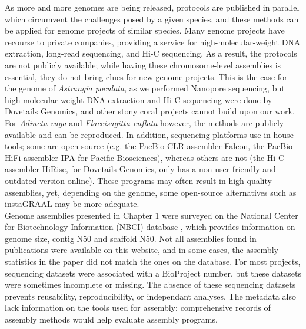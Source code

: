 As more and more genomes are being released, protocols are published in parallel which circumvent the challenges posed by a given species, and these methods can be applied for genome projects of similar species. Many genome projects have recourse to private companies, providing a service for high-molecular-weight DNA extraction, long-read sequencing, and Hi-C sequencing. As a result, the protocols are not publicly available; while having these chromosome-level assemblies is essential, they do not bring clues for new genome projects. This is the case for the genome of \textit{Astrangia poculata}, as we performed Nanopore sequencing, but high-molecular-weight DNA extraction and Hi-C sequencing were done by Dovetails Genomics, and other stony coral projects cannot build upon our work. For \textit{Adineta vaga} and \textit{Flaccisagitta enflata} however, the methods are publicly available and can be reproduced. In addition, sequencing platforms use in-house tools; some are open source (e.g. the PacBio CLR assembler Falcon, the PacBio HiFi assembler IPA for Pacific Biosciences), whereas others are not (the Hi-C assembler HiRise, for Dovetails Genomics, only has a non-user-friendly and outdated version online). These programs may often result in high-quality assemblies, yet, depending on the genome, some open-source alternatives such as instaGRAAL may be more adequate. \\

Genome assemblies presented in Chapter 1 were surveyed on the National Center for Biotechnology Information (NBCI) database \cite{ncbi}, which provides information on genome size, contig N50 and scaffold N50. Not all assemblies found in publications were available on this website, and in some cases, the assembly statistics in the paper did not match the ones on the database. For most projects, sequencing datasets were associated with a BioProject number, but these datasets were sometimes incomplete or missing. The absence of these sequencing datasets prevents reusability, reproducibility, or independant analyses. The metadata also lack information on the tools used for assembly; comprehensive records of assembly methods would help evaluate assembly programs. \\
